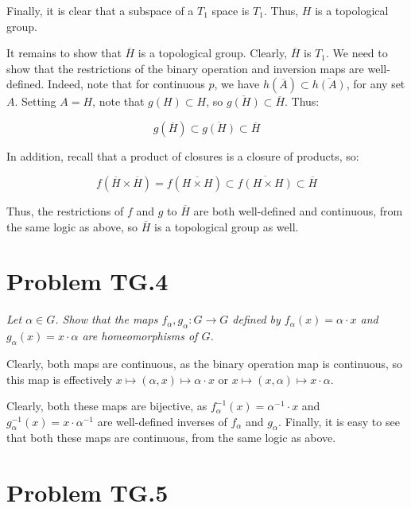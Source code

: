 \documentclass[10pt, oneside]{amsart}
\begin{document}
    Finally, it is clear that a subspace of a $T_1$ space is $T_1$. Thus, $H$ is a topological group.
    \newline

    It remains to show that $\overline{H}$ is a topological group. Clearly, $\overline{H}$ is $T_1$. We need to show that the restrictions of the binary operation and inversion maps
    are well-defined. Indeed, note that for continuous $p$, we have $h(\overline{A}) \subset \overline{h(A)}$, for any set $A$. Setting $A = H$, note that $g(H) \subset H$, so $\overline{g(H)} \subset \overline{H}$. Thus:

    $$g(\overline{H}) \subset \overline{g(H)} \subset \overline{H}$$

    In addition, recall that a product of closures is a closure of products, so:

    $$f(\overline{H} \times \overline{H}) = f(\overline{H \times H}) \subset \overline{f(H \times H)} \subset \overline{H}$$

    Thus, the restrictions of $f$ and $g$ to $\overline{H}$ are both well-defined and continuous, from the same logic as above, so $\overline{H}$ is a topological group as well.

    \hrulefill

    \section{Problem TG.4}


    \textit{Let $\alpha \in G$. Show that the maps $f_{\alpha}, g_{\alpha} : G \rightarrow G$ defined by $f_{\alpha}(x) = \alpha \cdot x$ and $g_{\alpha}(x) = x \cdot \alpha$ are homeomorphisms
      of $G$.}
    \newline

    Clearly, both maps are continuous, as the binary operation map is continuous, so this map is effectively $x \mapsto (\alpha, x) \mapsto \alpha \cdot x$ or $x \mapsto (x, \alpha) \mapsto x \cdot \alpha$.
    \newline

    Clearly, both these maps are bijective, as $f_{\alpha}^{-1}(x) = \alpha^{-1} \cdot x$ and $g_{\alpha}^{-1}(x) = x \cdot \alpha^{-1}$ are well-defined inverses of $f_{\alpha}$ and $g_{\alpha}$. Finally, it
    is easy to see that both these maps are continuous, from the same logic as above.

    \hrulefill

    \section{Problem TG.5}
\end{document}
